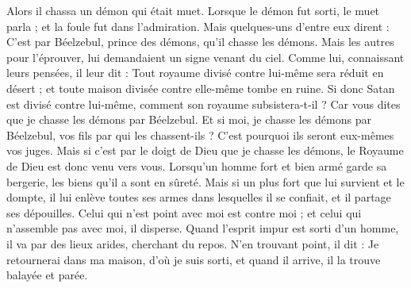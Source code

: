 \begin{multicols}{2}
Alors il chassa un démon qui était muet. Lorsque le démon fut sorti, le muet parla ; et la foule fut dans l’admiration.
Mais quelques-uns d'entre eux dirent : C’est par Béelzebul, prince des démons, qu'il chasse les démons.
Mais les autres pour l'éprouver, lui demandaient un signe venant du ciel.
Comme lui, connaissant leurs pensées, il leur dit : Tout royaume divisé contre lui-même sera réduit en désert ; et toute maison divisée contre elle-même tombe en ruine.
Si donc Satan est divisé contre lui-même, comment son royaume subsistera-t-il ? Car vous dites que je chasse les démons par Béelzebul.
Et si moi, je chasse les démons par Béelzebul, vos fils par qui les chassent-ils ? C’est pourquoi ils seront eux-mêmes vos juges.
Mais si c’est par le doigt de Dieu que je chasse les démons, le Royaume de Dieu est donc venu vers vous.
Lorsqu’un homme fort et bien armé garde sa bergerie, les biens qu'il a sont en sûreté.
Mais si un plus fort que lui survient et le dompte, il lui enlève toutes ses armes dans lesquelles il se confiait, et il partage ses dépouilles.
Celui qui n'est point avec moi est contre moi ; et celui qui n'assemble pas avec moi, il disperse.
Quand l'esprit impur est sorti d'un homme, il va par des lieux arides, cherchant du repos. N’en trouvant point, il dit : Je retournerai dans ma maison, d'où je suis sorti,
et quand il arrive, il la trouve balayée et parée.

\end{multicols}

